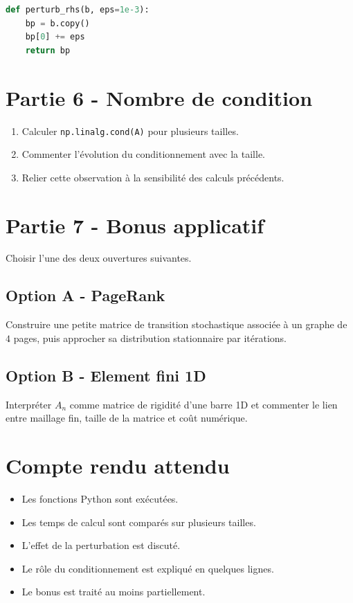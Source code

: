 \begin{lstlisting}[language=Python]
def perturb_rhs(b, eps=1e-3):
    bp = b.copy()
    bp[0] += eps
    return bp
\end{lstlisting}

\section*{Partie 6 - Nombre de condition}
\begin{enumerate}
    \item Calculer \texttt{np.linalg.cond(A)} pour plusieurs tailles.

    \item Commenter l'évolution du conditionnement avec la taille.

    \item Relier cette observation à la sensibilité des calculs précédents.
\end{enumerate}

\section*{Partie 7 - Bonus applicatif}
Choisir l'une des deux ouvertures suivantes.

\subsection*{Option A - PageRank}
Construire une petite matrice de transition stochastique associée à un graphe de $4$ pages, puis approcher sa distribution stationnaire par itérations.

\subsection*{Option B - Element fini 1D}
Interpréter $A_n$ comme matrice de rigidité d'une barre 1D et commenter le lien entre maillage fin, taille de la matrice et coût numérique.

\section*{Compte rendu attendu}
\begin{itemize}
    \item Les fonctions Python sont exécutées.
    \item Les temps de calcul sont comparés sur plusieurs tailles.
    \item L'effet de la perturbation est discuté.
    \item Le rôle du conditionnement est expliqué en quelques lignes.
    \item Le bonus est traité au moins partiellement.
\end{itemize}


